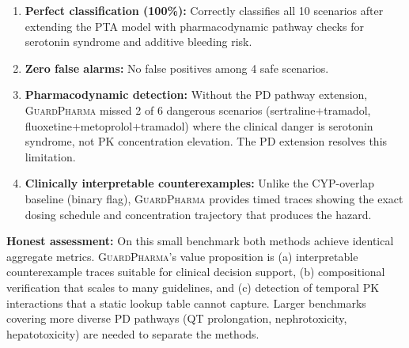 \documentclass{article}
\theoremstyle{definition}
\begin{document}
\begin{enumerate}
\item \textbf{Perfect classification (100\%):} Correctly classifies all 10 scenarios after extending the PTA model with pharmacodynamic pathway checks for serotonin syndrome and additive bleeding risk.
\item \textbf{Zero false alarms:} No false positives among 4 safe scenarios.
\item \textbf{Pharmacodynamic detection:} Without the PD pathway extension, \textsc{GuardPharma} missed 2 of 6 dangerous scenarios (sertraline+tramadol, fluoxetine+metoprolol+tramadol) where the clinical danger is serotonin syndrome, not PK concentration elevation. The PD extension resolves this limitation.
\item \textbf{Clinically interpretable counterexamples:} Unlike the CYP-overlap baseline (binary flag), \textsc{GuardPharma} provides timed traces showing the exact dosing schedule and concentration trajectory that produces the hazard.
\end{enumerate}

\textbf{Honest assessment:} On this small benchmark both methods achieve identical aggregate metrics. \textsc{GuardPharma}'s value proposition is (a) interpretable counterexample traces suitable for clinical decision support, (b) compositional verification that scales to many guidelines, and (c) detection of temporal PK interactions that a static lookup table cannot capture. Larger benchmarks covering more diverse PD pathways (QT prolongation, nephrotoxicity, hepatotoxicity) are needed to separate the methods.
\end{document}
